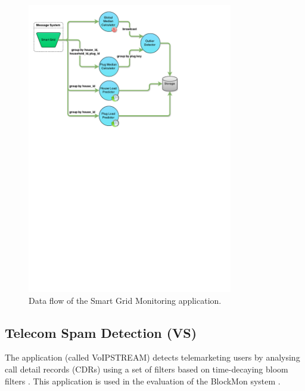 \documentclass[ppgc,diss,english]{iiufrgs}
\begin{document}
\begin{figure}[!ht]
	\centering
	\includegraphics[width=0.8\textwidth]{images/apps/SmartGrid.pdf}
	\caption{Data flow of the Smart Grid Monitoring application.}
	\label{fig:app_smart_grid}
\end{figure}


\subsection{Telecom Spam Detection (VS)}

The application (called VoIPSTREAM) detects telemarketing users by analysing call detail records (CDRs) using a set of filters based on time-decaying bloom filters \cite{bianchi2011demand}. This application is used in the evaluation of the BlockMon system \cite{huici2012blockmon}.
\end{document}
